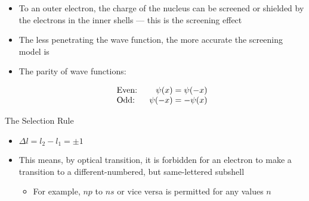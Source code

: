 \begin{itemize}
\begin{itemize}
      \item To an outer electron, the charge of the nucleus can be screened or shielded by the electrons in the inner shells — this is the screening effect

      \item The less penetrating the wave function, the more accurate the screening model is

      \item The parity of wave functions: 

        $$\begin{array}{l r} \text{Even: }&\psi(x) = \psi(-x)\\ \text{Odd: }&\psi(-x) = -\psi(x) \end{array}$$

    \end{itemize}

  \itemm The Selection Rule

    \begin{itemize}

      \item $\Delta l = l_2 - l_1 = \pm 1$

      \item This means, by optical transition, it is forbidden for an electron to make a transition to a different-numbered, but same-lettered subshell

        \begin{itemize}

          \item For example, $np$ to $ns$ or vice versa is permitted for any values $n$

        \end{itemize}
    \end{itemize}

\end{itemize}



